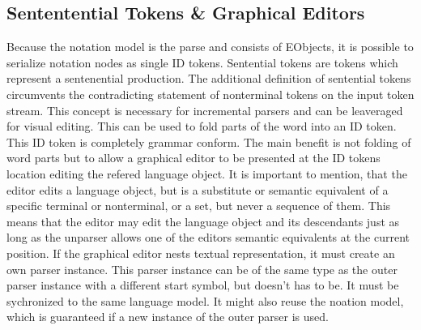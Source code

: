 \subsection{Sententential Tokens \& Graphical Editors}
Because the notation model is the parse and consists of EObjects, it is possible to serialize notation nodes as single ID tokens. Sentential tokens are tokens which represent a sentenential production. The additional definition of sentential tokens circumvents the contradicting statement of nonterminal tokens on the input token stream. This concept is necessary for incremental parsers and can be leaveraged for visual editing. This can be used to fold parts of the word into an ID token. This ID token is completely grammar conform. The main benefit is not folding of word parts but to allow a graphical editor to be presented at the ID tokens location editing the refered language object. It is important to mention, that the editor edits a language object, but is a substitute or semantic equivalent of a specific terminal or nonterminal, or a set, but never a sequence of them. This means that the editor may edit the language object and its descendants just as long as the unparser allows one of the editors semantic equivalents at the current position. If the graphical editor nests textual representation, it must create an own parser instance. This parser instance can be of the same type as the outer parser instance with a different start symbol, but doesn't has to be. It must be sychronized to the same language model. It might also reuse the noation model, which is guaranteed if a new instance of the outer parser is used.

 \\
 \\
 \\